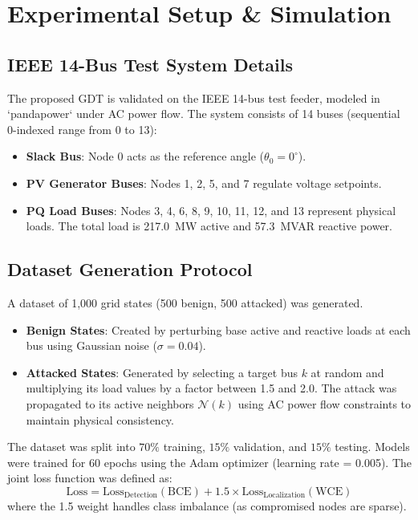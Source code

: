 \documentclass[conference]{IEEEtran}
\begin{document}
\section{Experimental Setup \& Simulation}

\subsection{IEEE 14-Bus Test System Details}
The proposed GDT is validated on the IEEE 14-bus test feeder, modeled in `pandapower` under AC power flow. The system consists of 14 buses (sequential 0-indexed range from 0 to 13):
\begin{itemize}
    \item \textbf{Slack Bus}: Node 0 acts as the reference angle ($\theta_0 = 0^\circ$).
    \item \textbf{PV Generator Buses}: Nodes 1, 2, 5, and 7 regulate voltage setpoints.
    \item \textbf{PQ Load Buses}: Nodes 3, 4, 6, 8, 9, 10, 11, 12, and 13 represent physical loads. The total load is 217.0~MW active and 57.3~MVAR reactive power.
\end{itemize}

\subsection{Dataset Generation Protocol}
A dataset of 1,000 grid states (500 benign, 500 attacked) was generated.
\begin{itemize}
    \item \textbf{Benign States}: Created by perturbing base active and reactive loads at each bus using Gaussian noise ($\sigma = 0.04$).
    \item \textbf{Attacked States}: Generated by selecting a target bus $k$ at random and multiplying its load values by a factor between 1.5 and 2.0. The attack was propagated to its active neighbors $\mathcal{N}(k)$ using AC power flow constraints to maintain physical consistency.
\end{itemize}
The dataset was split into $70\%$ training, $15\%$ validation, and $15\%$ testing. Models were trained for 60 epochs using the Adam optimizer (learning rate = 0.005). The joint loss function was defined as:
\begin{equation}
\text{Loss} = \text{Loss}_{\text{Detection}} (\text{BCE}) + 1.5 \times \text{Loss}_{\text{Localization}} (\text{WCE})
\end{equation}
where the 1.5 weight handles class imbalance (as compromised nodes are sparse).
\end{document}
